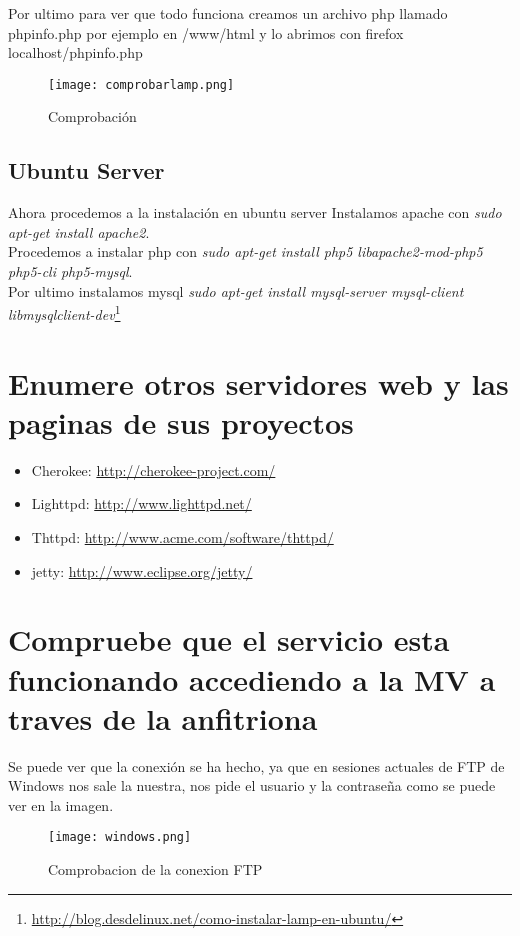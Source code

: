 Por ultimo para ver que todo funciona creamos un archivo php llamado phpinfo.php por ejemplo en /www/html y lo abrimos con firefox localhost/phpinfo.php
\begin{figure}[H] 
\centering
\texttt{[image: comprobarlamp.png]}  
\label{figura23:}
\caption{Comprobación}
\end{figure}
\subsection{Ubuntu Server}
Ahora procedemos a la instalación en ubuntu server
Instalamos apache con \textit{sudo apt-get install apache2}.
\\Procedemos a instalar php con \textit{sudo apt-get install php5 libapache2-mod-php5 php5-cli php5-mysql}.
\\Por ultimo instalamos mysql \textit{sudo apt-get install mysql-server mysql-client libmysqlclient-dev}\footnote{\url{http://blog.desdelinux.net/como-instalar-lamp-en-ubuntu/}}
\section{Enumere otros servidores web y las paginas de sus proyectos}
\begin{itemize}
\item Cherokee: \url{http://cherokee-project.com/}
\item Lighttpd: \url{http://www.lighttpd.net/}
\item Thttpd: \url{http://www.acme.com/software/thttpd/}
\item jetty: \url{http://www.eclipse.org/jetty/}
\end{itemize}
\section{Compruebe que el servicio esta funcionando accediendo a la MV a traves de la anfitriona}
Se puede ver que la conexión se ha hecho, ya que en sesiones actuales de FTP de Windows nos sale la nuestra, nos pide el usuario y la contraseña como se puede ver en la imagen.
\begin{figure}[H] 
\centering
\texttt{[image: windows.png]}  
\label{figura24:}
\caption{Comprobacion de la conexion FTP}
\end{figure}
